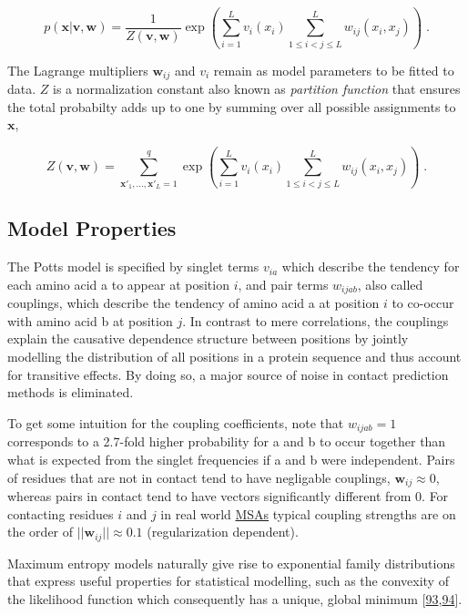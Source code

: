 \documentclass[11pt,a4paper,twoside]{book}
\newcommand{\seq}{\mathbf{x}}
\renewcommand{\v}{\mathbf{v}}
\newcommand{\vi}{v_{i}}
\newcommand{\via}{v_{ia}}
\newcommand{\w}{\mathbf{w}}
\newcommand{\wij}{\mathbf{w}_{ij}}
\newcommand{\wijab}{w_{ijab}}
\theoremstyle{definition}
\theoremstyle{definition}
\theoremstyle{remark}
\begin{document}
\begin{equation}
    p(\seq | \v, \w ) = \frac{1}{Z(\v, \w)} \exp \left( \sum_{i=1}^L v_i(x_i) \sum_{1 \leq i < j \leq L}^L w_{ij}(x_i, x_j) \right) \; .
\label{eq:max-ent-model}
\end{equation}

The Lagrange multipliers \(\wij\) and \(\vi\) remain as model parameters
to be fitted to data. \(Z\) is a normalization constant also known as
\emph{partition function} that ensures the total probabilty adds up to
one by summing over all possible assignments to \(\seq\),

\begin{equation}
  Z(\v, \w) = \sum_{\seq\prime_1, \ldots, \seq\prime_L = 1}^{q} \exp  \left( \sum_{i=1}^L v_i(x_i) \sum_{1 \leq i < j \leq L}^L w_{ij}(x_i, x_j) \right) \; .
  \label{eq:partition-fct-likelihood}
\end{equation}

\subsection{Model Properties}\label{potts-model-properties}

The Potts model is specified by singlet terms \(\via\) which describe
the tendency for each amino acid a to appear at position \(i\), and pair
terms \(\wijab\), also called couplings, which describe the tendency of
amino acid a at position \(i\) to co-occur with amino acid b at position
\(j\). In contrast to mere correlations, the couplings explain the
causative dependence structure between positions by jointly modelling
the distribution of all positions in a protein sequence and thus account
for transitive effects. By doing so, a major source of noise in contact
prediction methods is eliminated.

To get some intuition for the coupling coefficients, note that
\(\wijab = 1\) corresponds to a 2.7-fold higher probability for a and b
to occur together than what is expected from the singlet frequencies if
a and b were independent. Pairs of residues that are not in contact tend
to have negligable couplings, \(\wij \approx 0\), whereas pairs in
contact tend to have vectors significantly different from 0. For
contacting residues \(i\) and \(j\) in real world
\protect\hyperlink{abbrev}{MSAs} typical coupling strengths are on the
order of \(||\wij || \approx 0.1\) (regularization dependent).

Maximum entropy models naturally give rise to exponential family
distributions that express useful properties for statistical modelling,
such as the convexity of the likelihood function which consequently has
a unique, global minimum
{[}\protect\hyperlink{ref-Wainwright2007}{93},\protect\hyperlink{ref-Murphy2012}{94}{]}.
\end{document}
